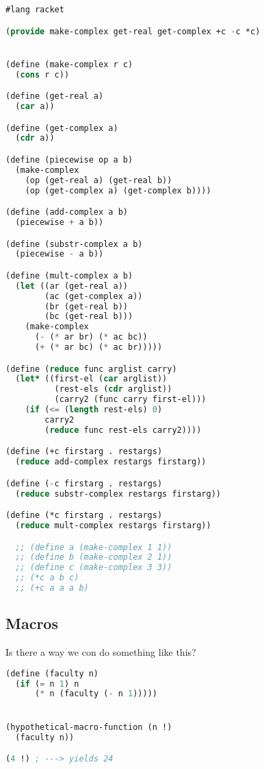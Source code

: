 \begin{lstlisting}[language=lisp]
#lang racket

(provide make-complex get-real get-complex +c -c *c)


(define (make-complex r c)
  (cons r c))

(define (get-real a)
  (car a))

(define (get-complex a)
  (cdr a))

(define (piecewise op a b)
  (make-complex
    (op (get-real a) (get-real b))
    (op (get-complex a) (get-complex b))))

(define (add-complex a b)
  (piecewise + a b))

(define (substr-complex a b)
  (piecewise - a b))

(define (mult-complex a b)
  (let ((ar (get-real a))
        (ac (get-complex a))
        (br (get-real b))
        (bc (get-real b)))
    (make-complex
      (- (* ar br) (* ac bc))
      (+ (* ar bc) (* ac br)))))

(define (reduce func arglist carry)
  (let* ((first-el (car arglist))
          (rest-els (cdr arglist))
          (carry2 (func carry first-el)))
    (if (<= (length rest-els) 0)
        carry2
        (reduce func rest-els carry2))))

(define (+c firstarg . restargs)
  (reduce add-complex restargs firstarg))

(define (-c firstarg . restargs)
  (reduce substr-complex restargs firstarg))

(define (*c firstarg . restargs)
  (reduce mult-complex restargs firstarg))

  ;; (define a (make-complex 1 1))
  ;; (define b (make-complex 2 1))
  ;; (define c (make-complex 3 3))
  ;; (*c a b c)
  ;; (+c a a a b)
\end{lstlisting}

\subsection{Macros}

Is there a way we con do something like this?
\begin{lstlisting}[language=lisp]
(define (faculty n)
  (if (= n 1) n
      (* n (faculty (- n 1)))))


(hypothetical-macro-function (n !)
  (faculty n))

(4 !) ; ---> yields 24
\end{lstlisting}



